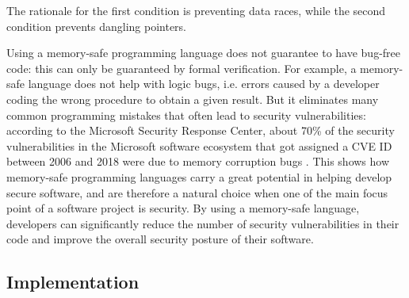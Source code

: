 \documentclass{report}
\begin{document}
The rationale for the first condition is preventing data races, while the second condition prevents dangling pointers. \par
Using a memory-safe programming language does not guarantee to have bug-free code: this can only be guaranteed by formal verification. For example, a memory-safe language does not
help with logic bugs, i.e. errors caused by a developer coding the wrong procedure to obtain a given result. But it eliminates many common programming
mistakes that often lead to security vulnerabilities: according to the Microsoft Security Response Center, about 70\% of the security vulnerabilities in the Microsoft software
ecosystem that got assigned a CVE ID \cite{cve_id} between 2006 and 2018 were due to memory corruption bugs \cite{proactive_approach_to_safety}. This shows how memory-safe programming 
languages carry a great potential in helping develop secure software, and are therefore a natural choice when one of the main focus point of a software project is security. By
using a memory-safe language, developers can significantly reduce the number of security vulnerabilities in their code and improve the overall security posture of their software. 


\subsection{Implementation}\label{failed_implementation}
\end{document}
